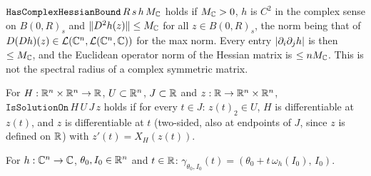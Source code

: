 \begin{definition}\label{bpN:p0:hess}
$\texttt{HasComplexHessianBound}\,R\,s\,h\,M_{\mathbb{C}}$ holds if $M_{\mathbb{C}}>0$, $h$ is $C^2$ in the complex sense on $B(0,R)_s$
and $\lVert D^2h(z)\rVert\le M_{\mathbb{C}}$ for all $z\in B(0,R)_s$, the norm being that of $D(Dh)(z)\in\mathcal L(\mathbb{C}^n,\mathcal L(\mathbb{C}^n,\mathbb{C}))$
for the max norm. Every entry $\lvert \partial_i\partial_jh\rvert$ is then $\le M_{\mathbb{C}}$, and the Euclidean operator norm of the
Hessian matrix is $\le nM_{\mathbb{C}}$. This is not the spectral radius of a complex symmetric matrix.
\end{definition}

\begin{definition}\label{bpN:p0:sol}
For $H:\mathbb{R}^n\times\mathbb{R}^n\to\mathbb{R}$, $U\subset\mathbb{R}^n$, $J\subset\mathbb{R}$ and $z:\mathbb{R}\to\mathbb{R}^n\times\mathbb{R}^n$,
$\texttt{IsSolutionOn}\,H\,U\,J\,z$ holds if for every $t\in J$: $z(t)_2\in U$, $H$ is differentiable at $z(t)$, and
$z$ is differentiable at $t$ (two-sided, also at endpoints of $J$, since $z$ is defined on $\mathbb{R}$) with
$z'(t)=X_H(z(t))$.
\end{definition}

\begin{definition}\label{bpN:p0:orbit}
For $h:\mathbb{C}^n\to\mathbb{C}$, $\theta_0,I_0\in\mathbb{R}^n$ and $t\in\mathbb{R}$:
$\gamma_{\theta_0,I_0}(t)=(\theta_0+t\,\omega_h(I_0),\,I_0)$.
\end{definition}


